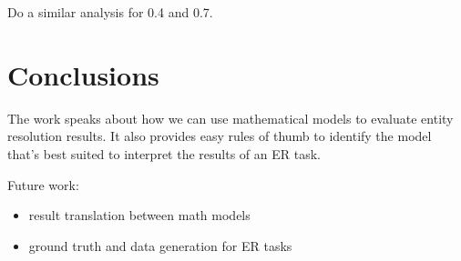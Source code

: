 \documentclass[11pt]{article}
\begin{document}
    Do a similar analysis for 0.4 and 0.7.

    \section[conclusion]{Conclusions}\label{section:conclusions}

    The work speaks about how we can use mathematical models to evaluate entity resolution results. It also provides easy rules of thumb to identify the model that's best suited to interpret the results of an ER task.
    
    Future work:
    \begin{itemize}
        \item result translation between math models
        \item ground truth and data generation for ER tasks
    \end{itemize}

    
\end{document}
